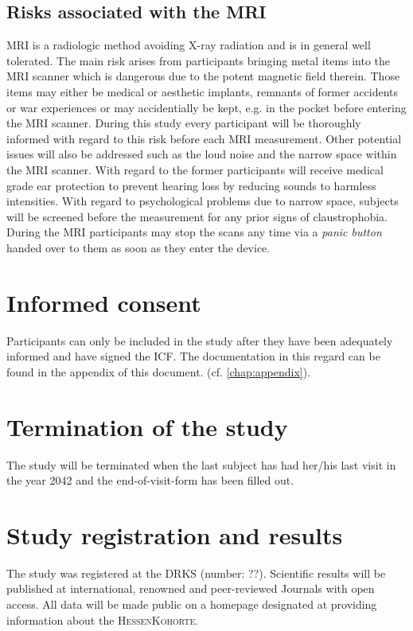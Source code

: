 
\subsection{Risks associated with the \ac{MRI}}
\ac{MRI} is a radiologic method avoiding X-ray radiation and is in general well tolerated. The main risk arises from participants bringing metal items into the \ac{MRI} scanner which is dangerous due to the potent magnetic field therein. Those items may either be medical or aesthetic implants, remnants of former accidents or war experiences or may accidentially be kept, e.g. in the pocket before entering the \ac{MRI} scanner. During this study every participant will be thoroughly informed with regard to this risk before each \ac{MRI}
measurement. Other potential issues will also be addressed such as the loud noise and the narrow space within the \ac{MRI} scanner. With regard to the former participants will receive medical grade ear protection to prevent hearing loss by reducing sounds to harmless intensities. With regard to psychological problems due to narrow space, subjects will be screened before the measurement for any prior signs of claustrophobia. During the \ac{MRI} participants may stop the scans any time via a \emph{panic button} handed over to them
as soon as they enter the device.

\section{Informed consent}
Participants can only be included in the study after they have been adequately informed and have signed the \ac{ICF}. The documentation in this regard can be found in the appendix of this document. (cf. \ref{chap:appendix}).

\section{Termination of the study}
The study will be terminated when the last subject has had her/his last visit in the year 2042 and the end-of-visit-form has been filled out.

\section{Study registration and results}
The study was registered at the \ac{DRKS} (number: ??). Scientific results will be published at international, renowned and peer-reviewed Journals with open access. All data will be made public on a homepage designated at providing information about the \textsc{HessenKohorte}.




